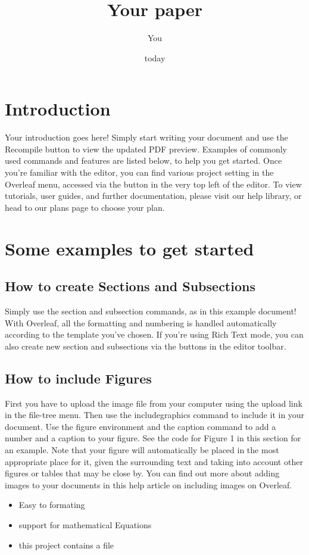 \documentclass{article}
\title{Your paper}
\author{You}
\date{today}
\begin{document}
\maketitle
\section{Introduction}
Your introduction goes here! Simply start writing your document and use the Recompile button to
view the updated PDF preview. Examples of commonly used commands and features are listed below,
to help you get started.
Once you’re familiar with the editor, you can find various project setting in the Overleaf menu,
accessed via the button in the very top left of the editor. To view tutorials, user guides, and further
documentation, please visit our help library, or head to our plans page to choose your plan.

\section{Some examples to get started}
\subsection{How to create Sections and Subsections}
Simply use the section and subsection commands, as in this example document! With Overleaf, all
the formatting and numbering is handled automatically according to the template you’ve chosen. If
you’re using Rich Text mode, you can also create new section and subsections via the buttons in the
editor toolbar.

\subsection{How to include Figures}
First you have to upload the image file from your computer using the upload link in the file-tree menu.
Then use the includegraphics command to include it in your document. Use the figure environment
and the caption command to add a number and a caption to your figure. See the code for Figure 1 in
this section for an example.
Note that your figure will automatically be placed in the most appropriate place for it, given the
surrounding text and taking into account other figures or tables that may be close by. You can find
out more about adding images to your documents in this help article on including images on Overleaf.
\begin{itemize}
	 \item Easy to formating
	 \item support for mathematical Equations
	 \item this project contains a file
\end{itemize}
\end{document}

